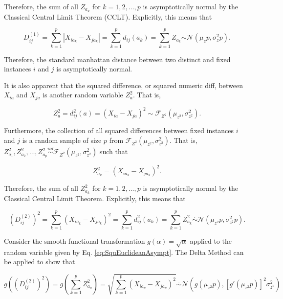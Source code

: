 \documentclass[10pt,letterpaper]{article}\usepackage[]{graphicx}\usepackage[]{color}
\begin{document}
Therefore, the sum of all $Z_{a_k}$ for $k=1,2,\dots,p$ is asymptotically normal by the Classical Central Limit Theorem (CCLT). Explicitly, this means that

\begin{equation}\label{eq:manhattanAsympt}
D^{(1)}_{ij} = \displaystyle \sum_{k=1}^{p}|X_{ia_k} - X_{ja_k}| = \displaystyle \sum_{k=1}^{p}d_{ij}(a_k) = \displaystyle \sum_{k=1}^{p}Z_{a_k} \overset{.}{\sim} \mathcal{N}(\mu_zp,\sigma^2_zp).
\end{equation}

Therefore, the standard manhattan distance between two distinct and fixed instances $i$ and $j$ is asymptotically normal.

It is also apparent that the squared difference, or squared numeric diff, between $X_{ia}$ and $X_{ja}$ is another random variable $Z^2_{a}$. That is,

\begin{equation}\label{eq:SqudiffDistr}
Z^2_a = d^2_{ij}(a) = (X_{ia} - X_{ja})^2 \sim \mathcal{F}_{Z^2}(\mu_{z^2},\sigma^2_{z^2}).
\end{equation}

Furthermore, the collection of all squared differences between fixed instances $i$ and $j$ is a random sample of size $p$ from $\mathcal{F}_{Z^2}(\mu_{z^2},\sigma^2_{z^2})$. That is, $Z^2_{a_1},Z^2_{a_2},\dots,Z^2_{a_p} \overset{iid}{\sim} \mathcal{F}_{Z^2}(\mu_{z^2},\sigma^2_{z^2})$ such that

\begin{equation}\label{eq:AllSqudiffDistr}
Z^2_{a_k} = (X_{ia_k} - X_{ja_k})^2.
\end{equation}

Therefore, the sum of all $Z^2_{a_k}$ for $k=1,2,\dots,p$ is asymptotically normal by the Classical Central Limit Theorem. Explicitly, this means that

\begin{equation}\label{eq:SquEuclideanAsympt}
\left(D^{(2)}_{ij}\right)^2 = \displaystyle \sum_{k=1}^{p}(X_{ia_k} - X_{ja_k})^2 = \displaystyle \sum_{k=1}^{p}d^2_{ij}(a_k) = \displaystyle \sum_{k=1}^{p}Z^2_{a_k} \overset{.}{\sim} \mathcal{N}(\mu_{z^2}p,\sigma^2_{z^2}p).
\end{equation}

Consider the smooth functional transformation $g(\alpha) = \sqrt{\alpha}$ applied to the random variable given by Eq. \ref{eq:SquEuclideanAsympt}. The Delta Method \cite{allStats} can be applied to show that

\begin{equation}\label{eq:DeltaMethod}
g\left(\left(D^{(2)}_{ij}\right)^2\right) = g\left(\displaystyle \sum_{k=1}^{p}Z^2_{a_k}\right) = \sqrt{\displaystyle \sum_{k=1}^{p} (X_{ia_k} - X_{ja_k})^2} \overset{.}{\sim} \mathcal{N}\left(g(\mu_{z^2}p),[g\prime(\mu_{z^2}p)]^2\sigma^2_{z^2}\right)
\end{equation}
\end{document}
